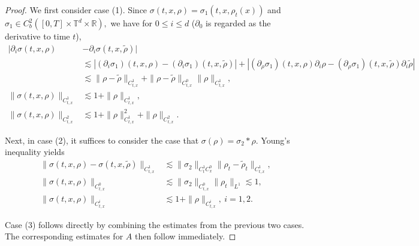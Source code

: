 \documentclass[UTF-8,reqno]{amsart}
\numberwithin{equation}{section}
\theoremstyle{definition}
\def\leq{\leqslant}
\def\leq{\leqslant}
\begin{document}
\begin{proof}
We first consider case \textnormal{(1)}. Since
$
\sigma(t,x,\rho)=\sigma_1(t,x,\rho_t(x))
$
and
$
\sigma_1\in C_b^2([0,T]\times\mathbb{T}^d\times\mathbb{R}),
$
we have for $0\leq i\leq d$ ($\partial_0$ is regarded as the derivative  to  time  $t$), 
\begin{align*}
|\partial_i\sigma(t,x,\rho)&-\partial_i\sigma(t,x,\tilde{\rho})|\\
&\lesssim|(\partial_i\sigma_1)(t,x,\rho)-(\partial_i\sigma_1)(t,x,\tilde{\rho})|+|(\partial_\rho\sigma_1)(t,x,\rho)\partial_i\rho-(\partial_\rho\sigma_1)(t,x,\tilde{\rho})\partial_i\tilde\rho|\\
&\lesssim 
\|\rho- \tilde{\rho} \|_{C_{t,x}^1}+\|\rho- \tilde{\rho} \|_{C_{t,x}^0}\|\rho \|_{C_{t,x}^1},
\\
\|\sigma(t,x,\rho)\|_{C_{t,x}^1}
&\lesssim
1+\|\rho\|_{C_{t,x}^1},\\
\|\sigma(t,x,\rho)\|_{C_{t,x}^2}
&\lesssim
1+\|\rho\|_{C_{t,x}^1}^2+\|\rho\|_{C_{t,x}^2}.
\end{align*}

Next, in case \textnormal{(2)}, it suffices to consider the case that $\sigma(\rho)=\sigma_2*\rho$. Young's inequality yields
\begin{align*}
\|\sigma(t,x,\rho)-\sigma(t,x,\tilde{\rho})\|_{C_{t,x}^1}
&\lesssim
\|\sigma_2\|_{C_{t}^1C_{x}^0}
\|\rho_t-\tilde{\rho}_t\|_{C_{t,x}^1},
\\
\|\sigma(t,x,\rho)\|_{C_{t,x}^0}
&\lesssim
\|\sigma_2\|_{C_{t,x}^0}\|\rho_t\|_{L^1}
\lesssim 1,
\\
\|\sigma(t,x,\rho)\|_{C_{t,x}^i}
&\lesssim
1+\|\rho\|_{C_{t,x}^i},\ i=1,2.
\end{align*}

Case \textnormal{(3)} follows directly by combining the estimates from the previous two cases.
The corresponding estimates for $A$ then follow immediately.
\end{proof}
\end{document}
